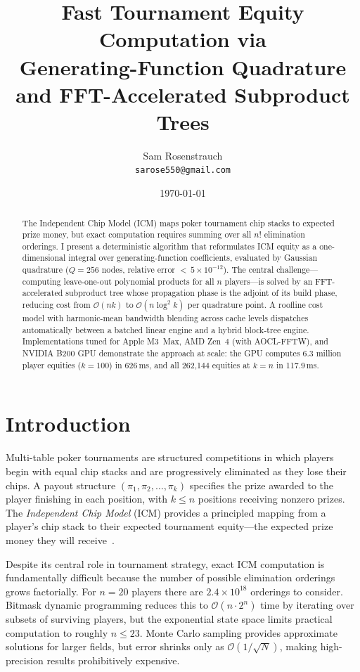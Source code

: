 \documentclass[11pt]{article}
\title{Fast Tournament Equity Computation via \\
       Generating-Function Quadrature and FFT-Accelerated Subproduct Trees}
\author{
  Sam Rosenstrauch \\
  \texttt{sarose550@gmail.com}
}
\date{\today}
\newcommand{\bigO}{\mathcal{O}}
\begin{document}
\maketitle

\begin{abstract}
The Independent Chip Model (ICM) maps poker tournament chip stacks to
expected prize money, but exact computation requires summing over all
$n!$ elimination orderings. I present a deterministic algorithm that
reformulates ICM equity as a one-dimensional integral over
generating-function coefficients, evaluated by Gaussian quadrature
($Q = 256$ nodes, relative error ${<}\,5 \times 10^{-12}$). The
central challenge---computing leave-one-out polynomial products for all
$n$ players---is solved by an FFT-accelerated subproduct tree whose
propagation phase is the adjoint of its build phase, reducing cost from
$\bigO(nk)$ to $\bigO(n \log^2 k)$ per quadrature point. A roofline
cost model with harmonic-mean bandwidth blending across cache levels
dispatches automatically between a batched linear engine and a hybrid
block-tree engine. Implementations tuned for Apple M3~Max,
AMD Zen~4 (with AOCL-FFTW), and NVIDIA B200 GPU demonstrate the
approach at scale: the GPU computes 6.3 million player equities
($k = 100$) in 626\,ms, and all 262{,}144 equities at $k = n$ in
117.9\,ms.
\end{abstract}

\section{Introduction}\label{sec:intro}

Multi-table poker tournaments are structured competitions in which
players begin with equal chip stacks and are progressively eliminated as
they lose their chips. A payout structure $(\pi_1, \pi_2, \ldots,
\pi_k)$ specifies the prize awarded to the player finishing in each
position, with $k \leq n$ positions receiving nonzero prizes. The
\emph{Independent Chip Model} (ICM) provides a principled mapping from a
player's chip stack to their expected tournament equity---the expected
prize money they will receive~\citep{malmuth2001,harville1973}.

Despite its central role in tournament strategy, exact ICM computation
is fundamentally difficult because the number of possible elimination
orderings grows factorially. For $n = 20$ players there are $2.4 \times
10^{18}$ orderings to consider. Bitmask dynamic programming reduces
this to $\bigO(n \cdot 2^n)$ time by iterating over subsets of surviving
players, but the exponential state space limits practical computation to
roughly $n \leq 23$. Monte Carlo sampling provides approximate solutions
for larger fields, but error shrinks only as $\bigO(1/\sqrt{N})$, making
high-precision results prohibitively expensive.
\end{document}
